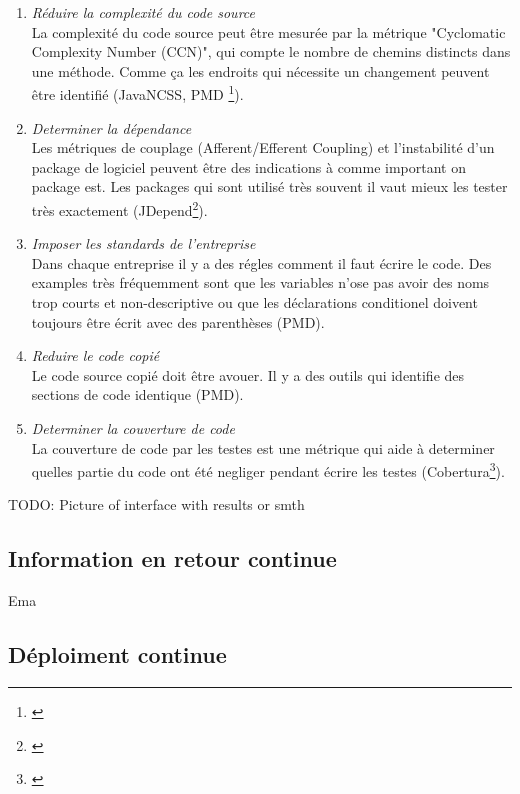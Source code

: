 \begin{enumerate}

\item \textit{Réduire la complexité du code source} \\ La complexité du code source peut être mesurée par la métrique "Cyclomatic Complexity Number (CCN)", qui compte le nombre de chemins distincts dans une méthode. Comme ça les endroits qui nécessite un changement peuvent être identifié (JavaNCSS, PMD \footnote{\citep{pluginpmd}}).

\item \textit{Determiner la dépendance} \\ Les métriques de couplage (Afferent/Efferent Coupling) et l'instabilité d'un package de logiciel peuvent être des indications à comme important on package est. Les packages qui sont utilisé très souvent il vaut mieux les tester très exactement (JDepend\footnote{\citep{pluginjdepend}}).

\item \textit{Imposer les standards de l'entreprise}\\ Dans chaque entreprise il y a des régles comment il faut écrire le code. Des examples très fréquemment sont que les variables n'ose pas avoir des noms trop courts et non-descriptive ou que les déclarations conditionel doivent toujours être écrit avec des parenthèses (PMD).
\item \textit{Reduire le code copié} \\ Le code source copié doit être avouer. Il y a des outils qui identifie des sections de code identique (PMD).

\item \textit{Determiner la couverture de code} \\ La couverture de code par les testes est une métrique qui aide à determiner quelles partie du code ont été negliger pendant écrire les testes (Cobertura\footnote{\citep{plugincobertura}}).

\end{enumerate}

TODO: Picture of interface with results or smth

\subsection{Information en retour continue}

Ema

\subsection{Déploiment continue}

